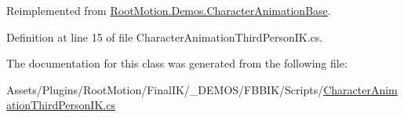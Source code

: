Reimplemented from \mbox{\hyperlink{class_root_motion_1_1_demos_1_1_character_animation_base_a4ddfae1bf92b14f0f1bb9ddd56ed093d}{Root\+Motion.\+Demos.\+Character\+Animation\+Base}}.



Definition at line 15 of file Character\+Animation\+Third\+Person\+I\+K.\+cs.



The documentation for this class was generated from the following file\+:\begin{DoxyCompactItemize}
\item 
Assets/\+Plugins/\+Root\+Motion/\+Final\+I\+K/\+\_\+\+D\+E\+M\+O\+S/\+F\+B\+B\+I\+K/\+Scripts/\mbox{\hyperlink{_character_animation_third_person_i_k_8cs}{Character\+Animation\+Third\+Person\+I\+K.\+cs}}\end{DoxyCompactItemize}
